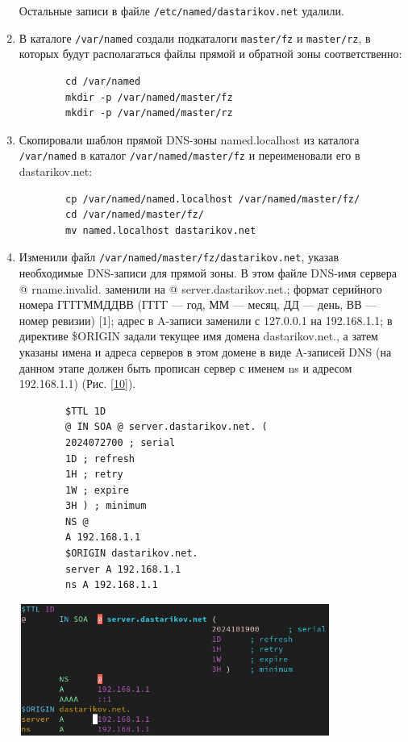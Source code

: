 \begin{enumerate}
    Остальные записи в файле {\tt /etc/named/dastarikov.net} удалили.
    \item В каталоге {\tt /var/named} создали подкаталоги {\tt master/fz} и {\tt master/rz}, в которых будут располагаться файлы прямой и обратной зоны соответственно:
        \begin{verbatim}
        cd /var/named
        mkdir -p /var/named/master/fz
        mkdir -p /var/named/master/rz
        \end{verbatim}
    \item Скопировали шаблон прямой DNS-зоны named.localhost из каталога {\tt /var/named} в каталог {\tt /var/named/master/fz} и переименовали его в dastarikov.net:
        \begin{verbatim}
        cp /var/named/named.localhost /var/named/master/fz/
        cd /var/named/master/fz/
        mv named.localhost dastarikov.net
        \end{verbatim}
    \item Изменили файл {\tt /var/named/master/fz/dastarikov.net}, указав необходимые DNS-записи для прямой зоны. В этом файле DNS-имя сервера @ rname.invalid. заменили на @ server.dastarikov.net.; формат серийного номера ГГГГММДДВВ (ГГГГ — год, ММ — месяц, ДД — день, ВВ — номер ревизии) [1]; адрес в A-записи заменили с 127.0.0.1 на 192.168.1.1; в директиве \$ORIGIN задали текущее имя домена dastarikov.net., а затем указаны имена и адреса серверов в этом домене в виде A-записей DNS (на данном этапе должен быть прописан сервер с именем ns и адресом 192.168.1.1) (Рис. \ref{10}).
        \begin{verbatim}
        $TTL 1D
        @ IN SOA @ server.dastarikov.net. (
        2024072700 ; serial
        1D ; refresh
        1H ; retry
        1W ; expire
        3H ) ; minimum
        NS @
        A 192.168.1.1
        $ORIGIN dastarikov.net.
        server A 192.168.1.1
        ns A 192.168.1.1
\end{verbatim}

\begin{center}
    \centering
    \includegraphics[width=0.8\textwidth]{../images/image10.png}
    \label{10}
\end{center}


\end{enumerate}
